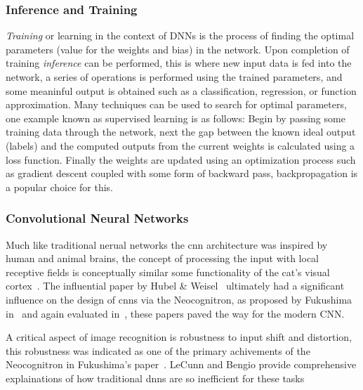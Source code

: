 \documentclass[../../D1.tex]{subfiles}
\begin{document}
\subsubsection{Inference and Training}

\emph{Training} or learning in the context of DNNs is the process of finding the optimal parameters (value for the weights and bias) in the network.
Upon completion of training \emph{inference} can be performed, this is where new input data is fed into the network, a series of operations is performed using the trained parameters, and some meaninful output is obtained such as a classification, regression, or function approximation.
Many techniques can be used to search for optimal parameters, one example known as supervised learning is as follows: 
Begin by passing some training data through the network, next the gap between the known ideal output (labels) and the computed outputs from the current weights is calculated using a loss function. Finally the weights are updated using an optimization process such as gradient descent coupled with some form of backward pass, backpropagation is a popular choice for this.



\subsubsection{Convolutional Neural Networks}

Much like traditional nerual networks the \Acrshort{cnn} architecture was inspired by human and animal brains, the concept of processing the input with local receptive fields is conceptually similar some functionality of the cat's visual cortex~\autocite{hubelReceptiveFieldsBinocular1962,lecunConvolutionalNetworksImages,pouyanfarSurveyDeepLearning2019}. 
The influential paper by Hubel \& Weisel~\autocite{hubelReceptiveFieldsBinocular1962} ultimately had a significant influence on the design of \Acrshort{cnn}s via the Neocognitron, as proposed by Fukushima in~\autocite{fukushimaNeocognitronSelforganizingNeural1980} and again evaluated in~\autocite{fukushimaNeocognitronHierarchicalNeural1988}, these papers paved the way for the modern CNN. 

A critical aspect of image recognition is robustness to input shift and distortion, this robustness was indicated as one of the primary achivements of the Neocognitron in Fukushima's paper~\autocite{fukushimaNeocognitronSelforganizingNeural1980}. LeCunn and Bengio provide comprehensive explainations of how traditional \acrshort{dnn}s are so inefficient for these tasks 
\end{document}
